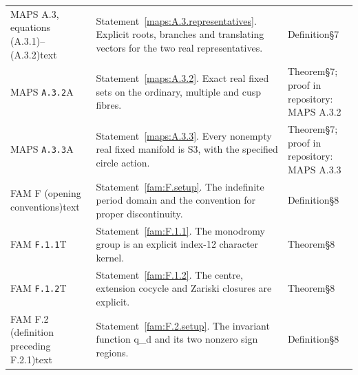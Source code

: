 \begin{longtable}{@{}L{.18\linewidth}L{.48\linewidth}L{.29\linewidth}@{}}
MAPS A.3, equations (A.3.1)--(A.3.2)\newline text & Statement~\ref{maps:A.3.representatives}. Explicit roots, branches and translating vectors for the two real representatives.\newline {} & Definition\newline §7\\
MAPS \nolinkurl{A.3.2}\newline A & Statement~\ref{maps:A.3.2}. Exact real fixed sets on the ordinary, multiple and cusp fibres.\newline {} & Theorem\newline §7; proof in repository:\allowbreak{} MAPS A.3.2\\
MAPS \nolinkurl{A.3.3}\newline A & Statement~\ref{maps:A.3.3}. Every nonempty real fixed manifold is S3, with the specified circle action.\newline {} & Theorem\newline §7; proof in repository:\allowbreak{} MAPS A.3.3\\
FAM F (opening conventions)\newline text & Statement~\ref{fam:F.setup}. The indefinite period domain and the convention for proper discontinuity.\newline {} & Definition\newline §8\\
FAM \nolinkurl{F.1.1}\newline T & Statement~\ref{fam:F.1.1}. The monodromy group is an explicit index-12 character kernel.\newline {} & Theorem\newline §8\\
FAM \nolinkurl{F.1.2}\newline T & Statement~\ref{fam:F.1.2}. The centre, extension cocycle and Zariski closures are explicit.\newline {} & Theorem\newline §8\\
FAM F.2 (definition preceding F.2.1)\newline text & Statement~\ref{fam:F.2.setup}. The invariant function q\_\allowbreak{}d and its two nonzero sign regions.\newline {} & Definition\newline §8\\

\end{longtable}
